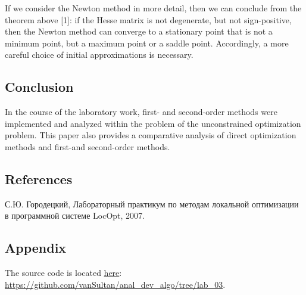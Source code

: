 If we consider the Newton method in more detail, then we can conclude from the theorem above [1]: if the Hesse matrix is not degenerate, but not sign-positive, then the Newton method can converge to a stationary point that is not a minimum point, but a maximum point or a saddle point.
Accordingly, a more careful choice of initial approximations is necessary.

\subsection{Conclusion}\label{subsec:conclusion}

In the course of the laboratory work,  first- and second-order methods were implemented and analyzed within the problem of the unconstrained optimization problem.
This paper also provides a comparative analysis of direct optimization methods and first-and second-order methods.

\subsection{References}\label{subsec:references}
\begin{enumerate}[label={[\arabic*]}]
    \item С.Ю. Городецкий, Лабораторный практикум по методам локальной оптимизации в программной системе LocOpt, 2007.
\end{enumerate}

\subsection{Appendix}\label{subsec:appendix}

The source code is located \href{https://github.com/vanSultan/anal_dev_algo/tree/lab_03}{here}: \url{https://github.com/vanSultan/anal_dev_algo/tree/lab_03}.

